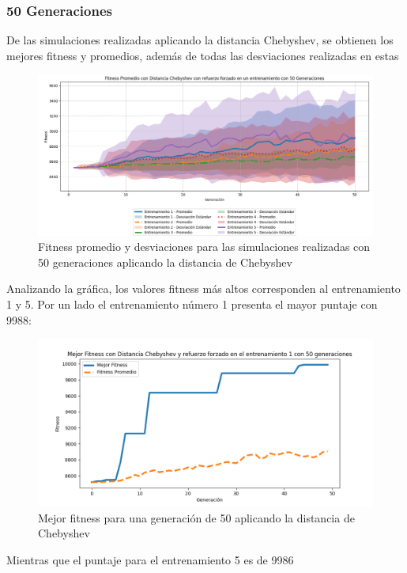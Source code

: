 \documentclass[conference]{IEEEtran}
\begin{document}
\subsubsection{50 Generaciones}
De las simulaciones realizadas aplicando la distancia Chebyshev, se obtienen los mejores fitness y promedios, además de todas las desviaciones realizadas en estas
\begin{figure}[H]
    \centering
    \includegraphics[width=1\linewidth]{Chebyshev/Fitness_Acumulado_Cheby_50Gen.png}
    \caption{Fitness promedio y desviaciones para las simulaciones realizadas con 50 generaciones aplicando la distancia de Chebyshev}
    \label{fig:chy_genral}
\end{figure}
Analizando la gráfica, los valores fitness más altos corresponden al entrenamiento 1 y 5. Por un lado el entrenamiento número 1 presenta el mayor puntaje con 9988:
\begin{figure}[H]
    \centering
    \includegraphics[width=0.9\linewidth]{Chebyshev/Fitness_Individual_50Gen/Fitness_1_Cheby_50Gen.png}
    \caption{Mejor fitness para una generación de 50 aplicando la distancia de Chebyshev}
    \label{fig:chy_1_best}
\end{figure}
Mientras que el puntaje para el entrenamiento 5 es de 9986
\end{document}
